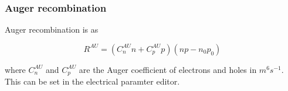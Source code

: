 \subsubsection{Auger recombination}
\label{sec:auger}
Auger recombination is as

\begin{equation}
R^{AU}=(C^{AU}_{n}n+C^{AU}_{p}p)(np-n_{0}p_{0})
\end{equation}

where $C^{AU}_{n}$ and $C^{AU}_{p}$ are the Auger coefficient of electrons and holes in $m^6 s^{-1}$. This can be set in the electrical paramter editor.

